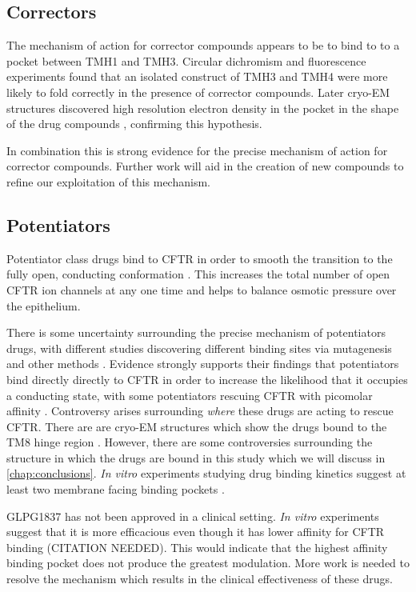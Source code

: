 \subsection{Correctors}
The mechanism of action for corrector compounds appears to be to bind to to a pocket between TMH1 and TMH3. Circular dichromism \cite{greenfield2006} and fluorescence experiments found that an isolated construct of TMH3 and TMH4 were more likely to fold correctly in the presence of corrector compounds. Later cryo-EM structures discovered high resolution electron density in the pocket in the shape of the drug compounds \cite{fiedorczuk2022}, confirming this hypothesis. 

In combination this is strong evidence for the precise mechanism of action for corrector compounds. Further work will aid in the creation of new compounds to refine our exploitation of this mechanism.

\subsection{Potentiators}
Potentiator class drugs bind to CFTR in order to smooth the transition to the fully open, conducting conformation \cite{yeh2017}. This increases the total number of open CFTR ion channels at any one time and helps to balance osmotic pressure over the epithelium.

There is some uncertainty surrounding the precise mechanism of potentiators drugs, with different studies discovering different binding sites via mutagenesis and other methods \cite{yeh2019, liu2019, laselva2021}. Evidence strongly supports their findings that potentiators bind directly directly to CFTR in order to increase the likelihood that it occupies a conducting state, with some potentiators rescuing CFTR with picomolar affinity \cite{csanady2019}. Controversy arises surrounding \textit{where} these drugs are acting to rescue CFTR. There are are cryo-EM structures which show the drugs bound to the TM8 hinge region \cite{liu2019}. However, there are some controversies surrounding the structure in which the drugs are bound in this study which we will discuss in \ref{chap:conclusions}. \textit {In vitro} experiments studying drug binding kinetics suggest at least two membrane facing binding pockets \cite{csanady2019}. 

GLPG1837 has not been approved in a clinical setting. \textit {In vitro} experiments suggest that it is more efficacious even though it has lower affinity for CFTR binding (CITATION NEEDED). This would indicate that the highest affinity binding pocket does not produce the greatest modulation. More work is needed to resolve the mechanism which results in the clinical effectiveness of these drugs.  

